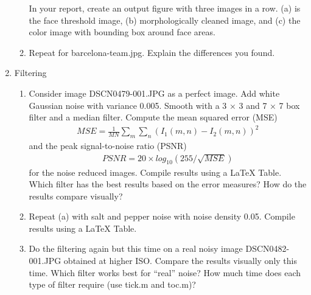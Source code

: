 \documentclass[12pt, letterpaper]{article}
\begin{document}
\begin{enumerate}
\begin{enumerate}
In your report, create an output figure with three images in a row. (a) is the face threshold image, (b) morphologically cleaned image, and (c) the color image with bounding
box around face areas.
	\item Repeat for barcelona-team.jpg. Explain the differences you found.
	\end{enumerate}
\item Filtering
	\begin{enumerate}
	\item Consider image DSCN0479-001.JPG as a perfect image. Add white Gaussian noise with
variance 0.005. Smooth with a 3 × 3 and 7 × 7 box filter and a median filter. Compute
the mean squared error (MSE)
	\begin{align*}
	MSE=\frac{1}{MN} \sum_{m} \sum_{n} (I_1(m,n)-I_2(m,n))^2
	\end{align*}
	and the peak signal-to-noise ratio (PSNR)
	\begin{align*}
	PSNR=20\times log_{10}(255/\sqrt{MSE})
	\end{align*}
	for the noise reduced images. Compile results using a \LaTeX{} Table. Which filter has the best results based on the error measures? How do the results compare visually?
	\item Repeat (a) with salt and pepper noise with noise density 0.05. Compile results using a \LaTeX{} Table.
	\item Do the filtering again but this time on a real noisy image DSCN0482-001.JPG obtained at higher ISO. Compare the results visually only this time. Which filter works best for ``real'' noise? How much time does each type of filter require (use tick.m and toc.m)?
	\end{enumerate}
\end{enumerate}
\end{document}
